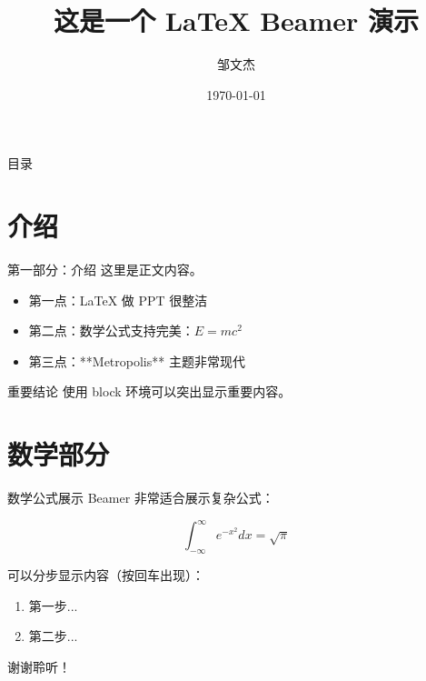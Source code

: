 \documentclass[aspectratio=169]{beamer}
\title{这是一个 LaTeX Beamer 演示}
\subtitle{}
\author{邹文杰}
\institute{哈尔滨商业大学}
\date{\today}
\begin{document}
\begin{frame}
    \titlepage
\end{frame}

\begin{frame}{目录}
    \tableofcontents
\end{frame}

\section{介绍}
\begin{frame}{第一部分：介绍}
    这里是正文内容。
    
    \begin{itemize}
        \item 第一点：LaTeX 做 PPT 很整洁
        \item 第二点：数学公式支持完美：$E = mc^2$
        \item 第三点：**Metropolis** 主题非常现代
    \end{itemize}
    
    \vspace{0.5cm} %
    
    \begin{block}{重要结论}
        使用 block 环境可以突出显示重要内容。
    \end{block}
\end{frame}

\section{数学部分}
\begin{frame}{数学公式展示}
    Beamer 非常适合展示复杂公式：
    
    $$
    \int_{-\infty}^{\infty} e^{-x^2} dx = \sqrt{\pi}
    $$
    
    可以分步显示内容（按回车出现）：
    \pause
    \begin{enumerate}
        \item 第一步...
        \pause
        \item 第二步...
    \end{enumerate}
\end{frame}

\begin{frame}
    \centering
    \Huge 谢谢聆听！
\end{frame}
\end{document}
